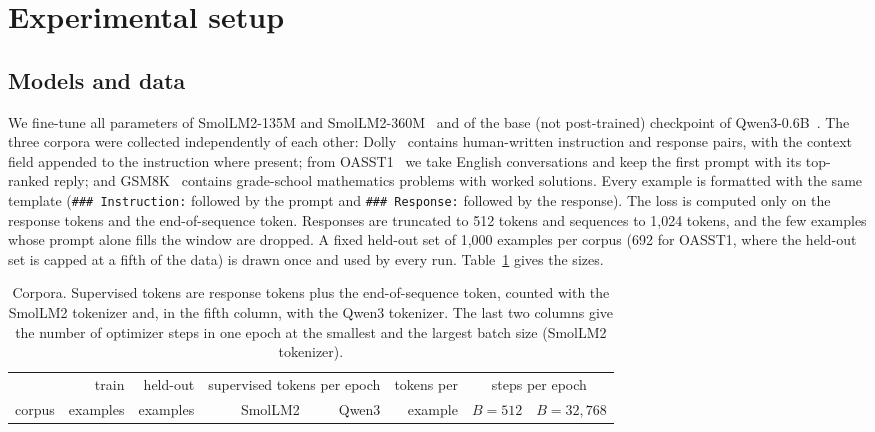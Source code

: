 \documentclass[10pt]{article}
\begin{document}
\section{Experimental setup}\label{sec:setup}

\subsection{Models and data}

We fine-tune all parameters of SmolLM2-135M and SmolLM2-360M~\citep{allal2025smollm2} and of the base (not post-trained) checkpoint of Qwen3-0.6B~\citep{qwen3}. The three corpora were collected independently of each other: Dolly~\citep{dolly2023} contains human-written instruction and response pairs, with the context field appended to the instruction where present; from OASST1~\citep{kopf2023oasst} we take English conversations and keep the first prompt with its top-ranked reply; and GSM8K~\citep{cobbe2021gsm8k} contains grade-school mathematics problems with worked solutions. Every example is formatted with the same template (\texttt{\#\#\# Instruction:} followed by the prompt and \texttt{\#\#\# Response:} followed by the response). The loss is computed only on the response tokens and the end-of-sequence token. Responses are truncated to 512 tokens and sequences to 1,024 tokens, and the few examples whose prompt alone fills the window are dropped. A fixed held-out set of 1,000 examples per corpus (692 for OASST1, where the held-out set is capped at a fifth of the data) is drawn once and used by every run. Table~\ref{tab:corpora} gives the sizes.

\begin{table}[t]
\centering
\caption{Corpora. Supervised tokens are response tokens plus the end-of-sequence token, counted with the SmolLM2 tokenizer and, in the fifth column, with the Qwen3 tokenizer. The last two columns give the number of optimizer steps in one epoch at the smallest and the largest batch size (SmolLM2 tokenizer).}
\label{tab:corpora}
\small
\setlength{\tabcolsep}{5pt}
\begin{tabular}{lrrrrrrr}
\toprule
 & train & held-out & \multicolumn{2}{c}{supervised tokens per epoch} & tokens per & \multicolumn{2}{c}{steps per epoch} \\
\cmidrule(lr){4-5}\cmidrule(lr){7-8}
corpus & examples & examples & SmolLM2 & Qwen3 & example & $B=512$ & $B=32{,}768$ \\
\midrule

\end{tabular}
\end{table}
\end{document}
